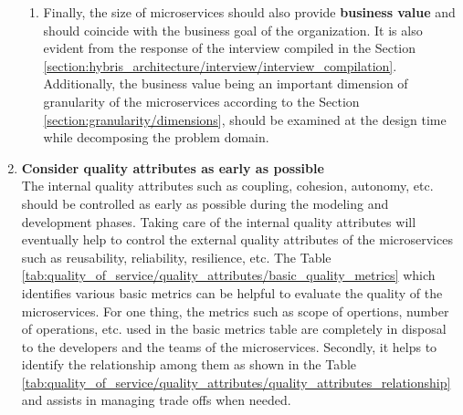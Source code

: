 \begin{enumerate}
\begin{enumerate}
\item Finally, the size of microservices should also provide \textbf{business value} and should coincide with the business goal of the organization. It is also evident from the response of the interview compiled in the Section \ref{section:hybris_architecture/interview/interview_compilation}. Additionally, the business value being an important dimension of granularity of the microservices according to the Section \ref{section:granularity/dimensions}, should be examined at the design time while decomposing the problem domain.
\end{enumerate}

\item \textbf{Consider quality attributes as early as possible} \\
The internal quality attributes such as coupling, cohesion, autonomy, etc. should be controlled as early as possible during the modeling and development phases. Taking care of the internal quality attributes will eventually help to control the external quality attributes of the microservices such as reusability, reliability, resilience, etc. The Table \ref{tab:quality_of_service/quality_attributes/basic_quality_metrics} which identifies various basic metrics can be helpful to evaluate the quality of the microservices. For one thing, the metrics such as scope of opertions, number of operations, etc. used in the basic metrics table are completely in disposal to the developers and the teams of the microservices. Secondly, it helps to identify the relationship among them as shown in the Table \ref{tab:quality_of_service/quality_attributes/quality_attributes_relationship} and assists in managing trade offs when needed.


\end{enumerate}
